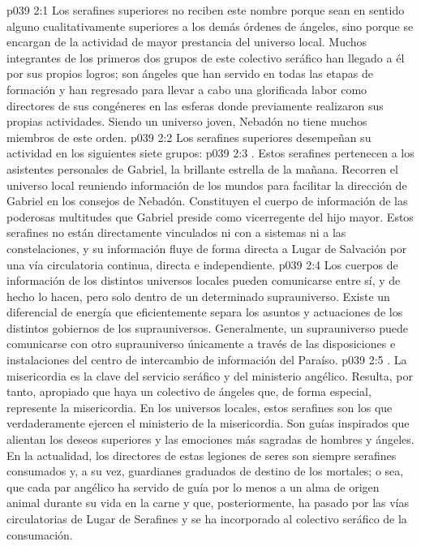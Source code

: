 \vs p039 2:1 Los serafines superiores no reciben este nombre porque sean en sentido alguno cualitativamente superiores a los demás órdenes de ángeles, sino porque se encargan de la actividad de mayor prestancia del universo local. Muchos integrantes de los primeros dos grupos de este colectivo seráfico han llegado a él por sus propios logros; son ángeles que han servido en todas las etapas de formación y han regresado para llevar a cabo una glorificada labor como directores de sus congéneres en las esferas donde previamente realizaron sus propias actividades. Siendo un universo joven, Nebadón no tiene muchos miembros de este orden.
\vs p039 2:2 Los serafines superiores desempeñan su actividad en los siguientes siete grupos:
\vs p039 2:3 . Estos serafines pertenecen a los asistentes personales de Gabriel, la brillante estrella de la mañana. Recorren el universo local reuniendo información de los mundos para facilitar la dirección de Gabriel en los consejos de Nebadón. Constituyen el cuerpo de información de las poderosas multitudes que Gabriel preside como vicerregente del hijo mayor. Estos serafines no están directamente vinculados ni con a sistemas ni a las constelaciones, y su información fluye de forma directa a Lugar de Salvación por una vía circulatoria continua, directa e independiente.
\vs p039 2:4 Los cuerpos de información de los distintos universos locales pueden comunicarse entre sí, y de hecho lo hacen, pero solo dentro de un determinado suprauniverso. Existe un diferencial de energía que eficientemente separa los asuntos y actuaciones de los distintos gobiernos de los suprauniversos. Generalmente, un suprauniverso puede comunicarse con otro suprauniverso únicamente a través de las disposiciones e instalaciones del centro de intercambio de información del Paraíso.
\vs p039 2:5 . La misericordia es la clave del servicio seráfico y del ministerio angélico. Resulta, por tanto, apropiado que haya un colectivo de ángeles que, de forma especial, represente la misericordia. En los universos locales, estos serafines son los que verdaderamente ejercen el ministerio de la misericordia. Son guías inspirados que alientan los deseos superiores y las emociones más sagradas de hombres y ángeles. En la actualidad, los directores de estas legiones de seres son siempre serafines consumados y, a su vez, guardianes graduados de destino de los mortales; o sea, que cada par angélico ha servido de guía por lo menos a un alma de origen animal durante su vida en la carne y que, posteriormente, ha pasado por las vías circulatorias de Lugar de Serafines y se ha incorporado al colectivo seráfico de la consumación.
